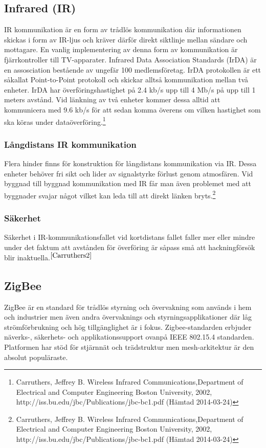 \documentclass[a4paper,12pt,fleqn]{article}
\begin{document}
\subsection{Infrared (IR)}
IR kommunikation är en form av trådlös kommunikation där informationen skickas i form av IR-ljus och kräver därför direkt siktlinje mellan sändare och mottagare. En vanlig implementering av denna form av kommunikation är fjärrkontroller till TV-apparater.
Infrared Data Association Standards (IrDA) är en assosciation bestående av ungefär 100 medlemsföretag. IrDA protokollen är ett såkallat Point-to-Point protokoll och skickar alltså kommunikation mellan två enheter. IrDA har överföringshastighet på 2.4 kb/s upp till 4 Mb/s på upp till 1 meters avstånd. Vid länkning av två enheter kommer dessa alltid att kommunicera med 9.6 kb/s för att sedan komma överens om vilken hastighet som ska köras under dataöverföring.\footnote{\label{Carruthers}Carruthers, Jeffrey B. Wireless Infrared Communications,Department of Electrical and Computer Engineering
Boston University, 2002, http://iss.bu.edu/jbc/Publications/jbc-bc1.pdf (Hämtad 2014-03-24)}  

\subsubsection{Långdistans IR kommunikation}
Flera hinder finns för konstruktion för långdistans kommunikation via IR. Dessa enheter behöver fri sikt och lider av signalstyrke förlust genom atmosfären. Vid byggnad till byggnad kommunikation med IR får man även problemet med att byggnader svajar något vilket kan leda till att direkt länken bryts.\footnote{\label{Carruthers2}Carruthers, Jeffrey B. Wireless Infrared Communications,Department of Electrical and Computer Engineering
Boston University, 2002, http://iss.bu.edu/jbc/Publications/jbc-bc1.pdf (Hämtad 2014-03-24)}

\subsubsection{Säkerhet}
Säkerhet i IR-kommunikationsfallet vid kortdistans fallet faller mer eller mindre under det faktum att avstånden för överföring är såpass små att hackningförsök blir inaktuella.$^{\ref{Carruthers2}}$

\subsection{ZigBee}
ZigBee är en standard för trådlös styrning och övervakning som används i hem och industrier men även andra övervaknings och styrningsapplikationer där låg strömförbrukning och hög tillgänglighet är i fokus. Zigbee-standarden erbjuder näverks-, säkerhets- och applikationssupport ovanpå IEEE 802.15.4 standarden. Platformen har stöd för stjärnnät och trädstruktur men mesh-arkitektur är den absolut populäraste. 
\end{document}
